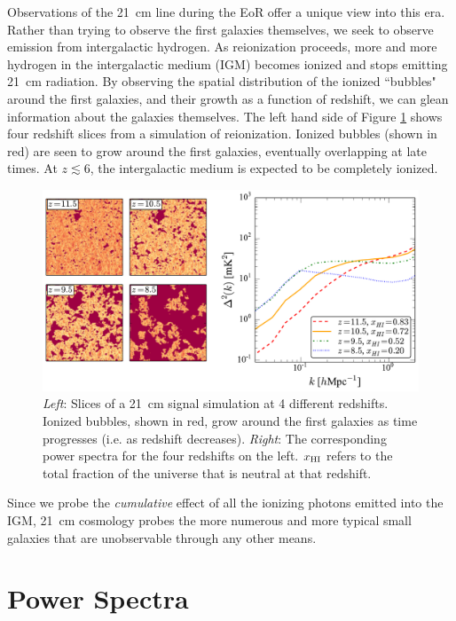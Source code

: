 Observations of the 21\ cm line during the EoR offer a unique view into this era.
Rather than trying to observe the first galaxies themselves, we seek to observe emission
from intergalactic hydrogen.  As reionization proceeds, more and more hydrogen in the
intergalactic medium (IGM) becomes ionized and stops emitting 21\ cm radiation.
By observing the spatial distribution of the ionized ``bubbles" around the first galaxies,
and their growth as a function of redshift, we can glean information about the galaxies themselves.
The left hand side of Figure \ref{fig:cubes_and_pspecs} shows four redshift slices from a simulation of reionization.
Ionized bubbles (shown in red) are seen to grow around the first galaxies, eventually overlapping at late times.
At $z \lesssim 6$, the intergalactic medium is expected to be completely ionized.
\begin{figure}[htbp!]
\centering
\includegraphics[width=4.5in]{figures/cubesAndPspecs.pdf}
\caption{\emph{Left}: Slices of a 21\ cm signal simulation at 4 different redshifts.  Ionized bubbles, shown in red, grow around the first galaxies as time progresses (i.e. as redshift decreases).  \emph{Right}: The corresponding power spectra for the four redshifts on the left.  $x_{\rm HI}$ refers to the total fraction of the universe that is neutral at that redshift.}
\label{fig:cubes_and_pspecs}
\end{figure}
Since we probe the \emph{cumulative} effect of all the ionizing photons emitted into the IGM,
21\ cm cosmology probes the more numerous and more typical small galaxies that are unobservable through
any other means.

\section{Power Spectra}

